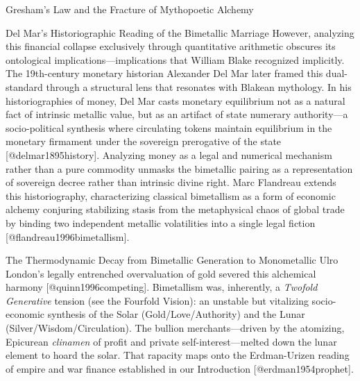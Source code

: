 \documentclass[
  ignorenonframetext,
]{beamer}
\begin{document}
\begin{frame}{Gresham's Law and the Fracture of Mythopoetic Alchemy}
\begin{block}{Del Mar's Historiographic Reading of the Bimetallic
Marriage}
\protect{}\label{del-mars-historiographic-reading-of-the-bimetallic-marriage}
However, analyzing this financial collapse exclusively through
quantitative arithmetic obscures its ontological
implications---implications that William Blake recognized implicitly.
The 19th-century monetary historian Alexander Del Mar later framed this
dual-standard through a structural lens that resonates with Blakean
mythology. In his historiographies of money, Del Mar casts monetary
equilibrium not as a natural fact of intrinsic metallic value, but as an
artifact of state numerary authority---a socio-political synthesis where
circulating tokens maintain equilibrium in the monetary firmament under
the sovereign prerogative of the state {[}@delmar1895history{]}.
Analyzing money as a legal and numerical mechanism rather than a pure
commodity unmasks the bimetallic pairing as a representation of
sovereign decree rather than intrinsic divine right. Marc Flandreau
extends this historiography, characterizing classical bimetallism as a
form of economic alchemy conjuring stabilizing stasis from the
metaphysical chaos of global trade by binding two independent metallic
volatilities into a single legal fiction
{[}@flandreau1996bimetallism{]}.
\end{block}

\begin{block}{The Thermodynamic Decay from Bimetallic Generation to
Monometallic Ulro}
\protect{}\label{the-thermodynamic-decay-from-bimetallic-generation-to-monometallic-ulro}
London's legally entrenched overvaluation of gold severed this
alchemical harmony {[}@quinn1996competing{]}. Bimetallism was,
inherently, a \emph{Twofold Generative} tension (see the Fourfold
Vision): an unstable but vitalizing socio-economic synthesis of the
Solar (Gold/Love/Authority) and the Lunar (Silver/Wisdom/Circulation).
The bullion merchants---driven by the atomizing, Epicurean
\emph{clinamen} of profit and private self-interest---melted down the
lunar element to hoard the solar. That rapacity maps onto the
Erdman-Urizen reading of empire and war finance established in our
Introduction {[}@erdman1954prophet{]}.


\end{block}
\end{frame}
\end{document}

